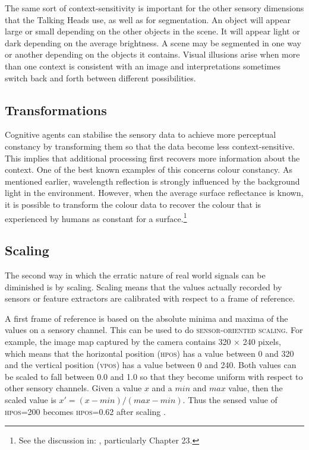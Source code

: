 The same sort of context-sensitivity 
is important for the other sensory dimensions 
that the Talking Heads use, as well as for segmentation. An 
object will appear large or small depending on the 
other objects in the scene. It will appear light 
or dark depending on the average brightness. 
A scene may be segmented in one way or another 
depending on the objects it contains. 
Visual illusions arise when more than one context
is consistent with an image and interpretations sometimes
switch back and forth between different possibilities. 

\subsection{Transformations}

Cognitive agents can stabilise the sensory data to
achieve more perceptual constancy by transforming them so 
that the data become less context-sensitive. 
This implies that additional processing first recovers
more information about the context. 
One of the best known examples of this concerns
colour constancy. As mentioned earlier, wavelength 
reflection is strongly influenced by the background 
light in the environment. However, when the average surface 
reflectance is known, it is possible to transform 
the colour data to recover the colour that is 
experienced by humans as constant for a surface.\footnote{
See the discussion in: \cite{Zeki:1993}, particularly Chapter 
23.}
 
\subsection{Scaling}

The second way in which the erratic nature of 
real world signals can be diminished is by
scaling. Scaling means that 
the values actually recorded by sensors or
feature extractors are calibrated with respect 
to a frame of reference. 

A first frame of reference is based on
the absolute minima and maxima of the values 
on a sensory channel. This can be used to do 
{\scshape sensor-oriented scaling}. For example, 
the image map captured by the camera
contains 320 × 240 pixels, which means 
that the horizontal position (\textsc{hpos}) has a value between
0 and 320 and the vertical position (\textsc{vpos}) has a value 
between 0 and 240. Both values can be scaled to fall between 
0.0 and 1.0 so that they become uniform with respect to 
other sensory channels. Given a value $x$ and a 
$min$ and $max$ value, then the scaled value is 
$x' = {(x - min)}/{(max - min)}$. 
Thus the sensed value of \textsc{hpos}=200 becomes
\textsc{hpos}=0.62 after scaling . 

